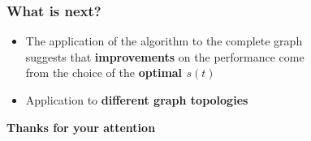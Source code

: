 \documentclass{beamer}
\newcommand{\bb}[1]{\textbf{\textcolor{darkish_blue}{#1}}}
\begin{document}
\begin{frame}
\frametitle{What is next?}

\begin{itemize}
	\item The application of the algorithm to the complete graph \\suggests that \bb{improvements} on the performance come\\ from the choice of the \bb{optimal $s(t)$}
\end{itemize}
\vspace{0.3cm}
\begin{itemize}
	\item Application to \bb{different graph topologies}
\end{itemize}
\end{frame}


\begin{frame}
\centering
\vspace{0.5cm}
\bb{Thanks for your attention}
\end{frame}

\end{document}
